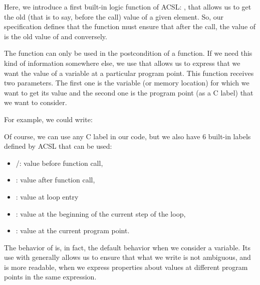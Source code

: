 




Here, we introduce a first built-in logic function of ACSL:
, that allows us to get the old (that
is to say, before the call) value of a given element. So, our specification
defines that the function must ensure that after the call, the value of
 is the old  value of  and conversely.

The  function can only be used in the
postcondition of a function. If we need this kind of information
somewhere else, we use  that allows us
to express that we want the value of a variable at a particular program
point. This function receives two parameters. The first one is the variable
(or memory location) for which we want to get its value and the second one
is the program point (as a C label) that we want to consider.

For example, we could write:






Of course, we can use any C label in our code, but we also have 6
built-in labels defined by ACSL that can be used:



\begin{itemize}
\item {}/: value before function call,
\item {}: value after function call,
\item {}: value at loop entry
\item {}: value at the beginning of the current step of
  the loop,
\item {}: value at the current program point.
\end{itemize}


\begin{Information}
  The behavior of  is, in fact, the default behavior when we
  consider a variable. Its use with 
  generally allows us to ensure that what we write is not ambiguous, and is more
  readable, when we express properties about values at different program
  points in the same expression.
\end{Information}


